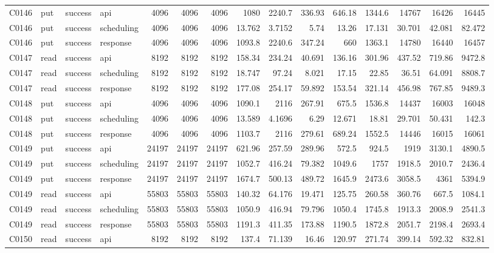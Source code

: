 \begin{landscape}
\begin{longtable}{llllrrrrrrrrrrr}
C0146 & put & success & api & 4096 & 4096 & 4096 & 1080 & 2240.7 & 336.93 & 646.18 & 1344.6 & 14767 & 16426 & 16445\\
C0146 & put & success & scheduling & 4096 & 4096 & 4096 & 13.762 & 3.7152 & 5.74 & 13.26 & 17.131 & 30.701 & 42.081 & 82.472\\
C0146 & put & success & response & 4096 & 4096 & 4096 & 1093.8 & 2240.6 & 347.24 & 660 & 1363.1 & 14780 & 16440 & 16457\\
C0147 & read & success & api & 8192 & 8192 & 8192 & 158.34 & 234.24 & 40.691 & 136.16 & 301.96 & 437.52 & 719.86 & 9472.8\\
C0147 & read & success & scheduling & 8192 & 8192 & 8192 & 18.747 & 97.24 & 8.021 & 17.15 & 22.85 & 36.51 & 64.091 & 8808.7\\
C0147 & read & success & response & 8192 & 8192 & 8192 & 177.08 & 254.17 & 59.892 & 153.54 & 321.14 & 456.98 & 767.85 & 9489.3\\
C0148 & put & success & api & 4096 & 4096 & 4096 & 1090.1 & 2116 & 267.91 & 675.5 & 1536.8 & 14437 & 16003 & 16048\\
C0148 & put & success & scheduling & 4096 & 4096 & 4096 & 13.589 & 4.1696 & 6.29 & 12.671 & 18.81 & 29.701 & 50.431 & 142.3\\
C0148 & put & success & response & 4096 & 4096 & 4096 & 1103.7 & 2116 & 279.61 & 689.24 & 1552.5 & 14446 & 16015 & 16061\\
C0149 & put & success & api & 24197 & 24197 & 24197 & 621.96 & 257.59 & 289.96 & 572.5 & 924.5 & 1919 & 3130.1 & 4890.5\\
C0149 & put & success & scheduling & 24197 & 24197 & 24197 & 1052.7 & 416.24 & 79.382 & 1049.6 & 1757 & 1918.5 & 2010.7 & 2436.4\\
C0149 & put & success & response & 24197 & 24197 & 24197 & 1674.7 & 500.13 & 489.72 & 1645.9 & 2473.6 & 3058.5 & 4361 & 5394.9\\
C0149 & read & success & api & 55803 & 55803 & 55803 & 140.32 & 64.176 & 19.471 & 125.75 & 260.58 & 360.76 & 667.5 & 1084.1\\
C0149 & read & success & scheduling & 55803 & 55803 & 55803 & 1050.9 & 416.94 & 79.796 & 1050.4 & 1745.8 & 1913.3 & 2008.9 & 2541.3\\
C0149 & read & success & response & 55803 & 55803 & 55803 & 1191.3 & 411.35 & 173.88 & 1190.5 & 1872.8 & 2051.7 & 2198.4 & 2693.4\\
C0150 & read & success & api & 8192 & 8192 & 8192 & 137.4 & 71.139 & 16.46 & 120.97 & 271.74 & 399.14 & 592.32 & 832.81\\

\end{longtable}
\end{landscape}
